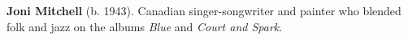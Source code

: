 \textbf{Joni Mitchell} (b. 1943). Canadian singer-songwriter and painter who blended folk and jazz on the albums \emph{Blue} and \emph{Court and Spark}.


